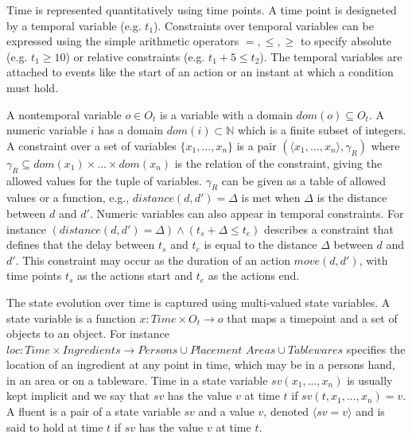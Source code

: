 Time is represented quantitatively using time points. %
A time point is designeted by a temporal variable (e.g. $t_1$).
Constraints over temporal variables can be expressed using the simple arithmetic operators $=,\leq,\geq$ to specify absolute  (e.g. $t_1 \geq 10$) or relative constraints (e.g. $t_1 + 5 \leq t_2$).
The temporal variables are attached to events like the start of an action or an instant at which a condition must hold.

A nontemporal variable $o \in O_t$ is a variable with a domain $dom(o) \subseteq O_t$.
A numeric variable $i$ has a domain $dom(i) \subset \mathbb{N}$ which is a finite subset of integers.
A constraint over a set of variables $\{x_1,\dots ,x_n \}$ is a pair $(\langle x_1, \dots , x_n \rangle, \gamma_R)$ where $\gamma_R \subseteq dom(x_1) \times \dots \times dom(x_n)$ is the relation of the constraint, giving the allowed values for the tuple of variables.
$\gamma_R$ can be given as a table of allowed values or a function, e.g., $\textit{distance}(d, d') = \Delta$ is met when $\Delta$ is the distance between $d$ and $d'$.
Numeric variables can also appear in temporal constraints.
For instance $(\textit{distance}(d, d') = \Delta) \land (t_s + \Delta \leq t_e)$ describes a constraint that defines that the delay between $t_s$ and $t_e$ is equal to the distance $\Delta$ between $d$ and $d'$.
This constraint may occur as the duration of an action $move(d,d')$, with time points $t_s$ as the actions start and $t_e$ as the actions end.

The state evolution over time is captured using multi-valued state variables.
A state variable is a function $x : Time \times O_t \rightarrow o$ that maps a timepoint and a set of objects to an object.
For instance $loc : Time \times Ingredients \rightarrow \textit{Persons} \cup \textit{Placement Areas} \cup \textit{Tablewares}$ specifies the location of an ingredient at any point in time, which may be in a persons hand, in an area or on a tableware.
Time in a state variable $sv(x_1,...,x_n)$ is usually kept implicit and we say that $sv$ has the value $v$ at time $t$ if $sv(t,x_1,...,x_n) = v$.
A fluent is a pair of a state variable $sv$ and a value $v$, denoted $\langle sv=v \rangle$ and is said to hold at time $t$ if $sv$ has the value $v$ at time $t$.

